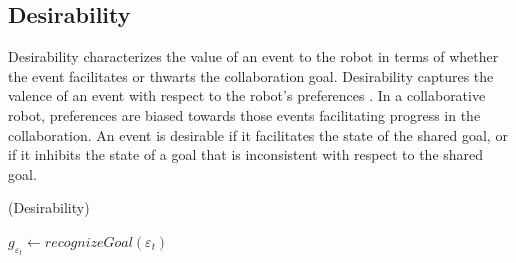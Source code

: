 \documentclass{aamas2016}
\begin{document}
\subsection{Desirability}

Desirability characterizes the value of an event to the robot in terms of
whether the event facilitates or thwarts the collaboration goal. Desirability
captures the valence of an event with respect to the robot's preferences
\cite{gratch:domain-independent}. In a collaborative robot, preferences are
biased towards those events facilitating progress in the collaboration. An event
is desirable if it facilitates the state of the shared goal, or if it inhibits
the state of a goal that is inconsistent with respect to the shared goal.

\begin{algorithm}
	\caption{(Desirability)}
	\label{alg:desirability}
	\begin{algorithmic}[1]
			\Statex
			 \State {}
			 \State {}
				\Statex
				 \State {}
				 \State {}
					\State {}
					\Statex
					\State $\mathit{g}_{\varepsilon_t} \gets
					\textit{recognizeGoal}{(\varepsilon_t)}$
					\Statex
						\State {}
					\EndIf
					\Statex
						\State {}
					\ElsIf {(\textit{{\fontsize{9}{9}\selectfont
}}}
\end{algorithmic}
\end{algorithm}
\end{document}
